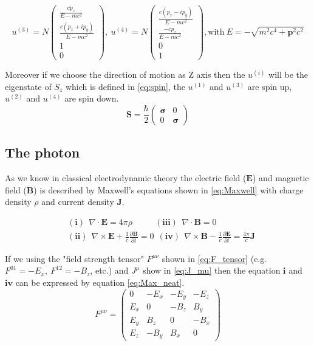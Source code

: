 \begin{equation}
u^{(3)}=N\begin{pmatrix} \frac{cp_{z}}{E-mc^{2}} \\ \frac{c(p_{x}+ip_{y})}{E-mc^{2}} \\ 1 \\ 0 \end{pmatrix},~
u^{(4)}=N\begin{pmatrix} \frac{c(p_{x}-ip_{y})}{E-mc^{2}} \\ \frac{-cp_{z}}{E-mc^{2}} \\ 0 \\ 1 \end{pmatrix}, \mathrm{with}~E=-\sqrt{m^{2}c^{4}+\mathbf{p}^{2}c^{2}}
\label{eq:plane_wave_s5}
\end{equation}

Moreover if we choose the direction of motion as Z axis then the $u^{(i)}$ will be the eigenstate of $S_{z}$ which is defined in \ref{eq:spin}, the $u^{(1)}$ and $ u^{(3)}$ are spin up, $u^{(2)}$ and $ u^{(4)}$ are spin down.
\begin{equation}
\mathbf{S}=\frac{\hbar}{2}\begin{pmatrix} \pmb{\sigma} & 0\\ 0 & \pmb{\sigma}\end{pmatrix}
\label{eq:spin}
\end{equation}

\subsection{The photon}\label{subsec:Photon}
As we know in classical electrodynamic theory the electric field ($\mathbf{E}$) and magnetic field ($\mathbf{B}$) is described by Maxwell's equations shown in \ref{eq:Maxwell} with charge density $\rho$ and current density $\mathbf{J}$.

\begin{equation}
\begin{split}
&(\mathbf{i})~~\nabla\cdot \mathbf{E}=4\pi\rho ~~~~~~~~~~~~ (\mathbf{iii})~~\nabla\cdot \mathbf{B}=0 \\
&(\mathbf{ii})~~\nabla\times\mathbf{E}+\frac{1}{c}\frac{\partial\mathbf{B}}{\partial t}=0 ~~(\mathbf{iv})~~\nabla\times\mathbf{B}-\frac{1}{c}\frac{\partial\mathbf{E}}{\partial t}=\frac{4\pi}{c}\mathbf{J}
\end{split}
\label{eq:Maxwell}
\end{equation}

If we using the "field strength tensor" $F^{\mu\nu}$ shown in \ref{eq:F_tensor} (e.g. $F^{01}=-E_{x}, ~F^{12}=-B_{z}$, etc.) and $J^{\mu}$ show in \ref{eq:J_mu} then the equation $\mathbf{i}$ and $\mathbf{iv}$ can be expressed by equation \ref{eq:Max_neat}.
\begin{equation}
F^{\mu\nu}=\begin{pmatrix} 0 & -E_{x} & -E_{y} & -E_{z}\\ E_{x} & 0 & -B_{z} & B_{y} \\ E_{y} & B_{z} & 0 & -B_{x} \\ E_{z} & -B_{y} & B_{x} & 0\end{pmatrix}
\label{eq:F_tensor}
\end{equation}

